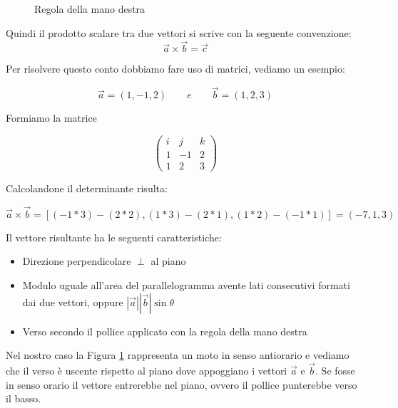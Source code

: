 \begin{figure}[tb]
\begin{tikzpicture}[scale = 0.7]
    \end{tikzpicture}
    \caption{Regola della mano destra}
    \label{fig:manoDx}
\end{figure}

Quindi il prodotto scalare tra due vettori si scrive con la seguente convenzione:
\begin{equation*}
    \vec{a}\times\vec{b} = \vec{c}
\end{equation*}

Per risolvere questo conto dobbiamo fare uso di matrici, vediamo un esempio:

\begin{equation*}
    \vec{a} = (1,-1,2) \qquad e \qquad \vec{b} = (1,2,3)
\end{equation*}

Formiamo la matrice 

$$
\begin{pmatrix}
i & j & k \\
1 & -1 & 2 \\
1 & 2 & 3 
\end{pmatrix}
$$

Calcolandone il determinante risulta:


\begin{equation*}
    \vec{a}\times\vec{b} = [(-1*3)-(2*2), (1*3)-(2*1), (1*2)-(-1*1)] = (-7, 1, 3)
\end{equation*}

Il vettore risultante ha le seguenti caratteristiche: 
\begin{itemize}
    \item Direzione perpendicolare $\perp$ al piano
    \item Modulo uguale all'area del parallelogramma avente lati consecutivi formati dai due vettori, oppure $|\vec{a}||\vec{b}|\sin{\theta}$
    \item Verso secondo il pollice applicato con la regola della mano destra
\end{itemize}

Nel nostro caso la Figura \ref{fig:manoDx} rappresenta un moto in senso antiorario e vediamo che il verso è uscente rispetto al piano dove appoggiano i vettori $\vec{a}$ e $\vec{b}$. Se fosse in senso orario il vettore entrerebbe nel piano, ovvero il pollice punterebbe verso il basso.

